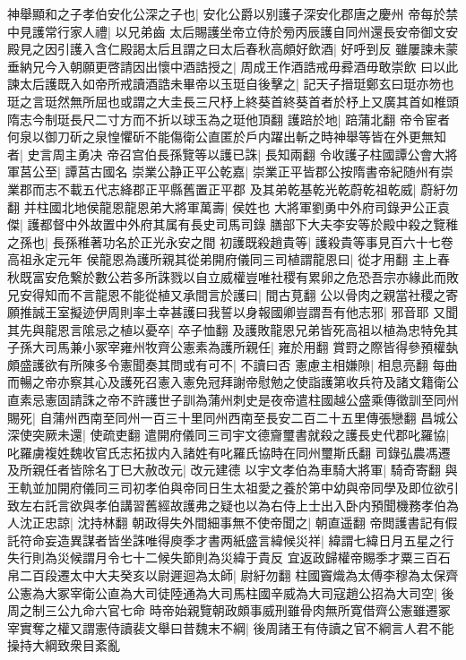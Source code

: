 神舉顯和之子孝伯安化公深之子也|{
	安化公爵以别護子深安化郡唐之慶州}
帝每於禁中見護常行家人禮|{
	以兄弟齒}
太后賜護坐帝立侍於㫄丙辰護自同州還長安帝御文安殿見之因引護入含仁殿謁太后且謂之曰太后春秋高頗好飲酒|{
	好呼到反}
雖屢諫未蒙垂納兄今入朝願更啓請因出懷中酒誥授之|{
	周成王作酒誥戒毋彛酒毋敢崇飲}
曰以此諫太后護既入如帝所戒讀酒誥未畢帝以玉珽自後擊之|{
	記天子搢珽鄭玄曰珽亦笏也珽之言珽然無所屈也或謂之大圭長三尺杼上終葵首終葵首者於杼上又廣其首如椎頭隋志今制珽長尺二寸方而不折以球玉為之珽他頂翻}
護踣於地|{
	踣蒲北翻}
帝令宦者何泉以御刀斫之泉惶懼斫不能傷衛公直匿於戶内躍出斬之時神舉等皆在外更無知者|{
	史言周主勇决}
帝召宫伯長孫覽等以護已誅|{
	長知兩翻}
令收護子柱國譚公會大將軍莒公至|{
	譚莒古國名}
崇業公静正平公乾嘉|{
	崇業正平皆郡公按隋書帝紀随州有崇業郡而志不載五代志絳郡正平縣舊置正平郡}
及其弟乾基乾光乾蔚乾祖乾威|{
	蔚紆勿翻}
并柱國北地侯龍恩龍恩弟大將軍萬壽|{
	侯姓也}
大將軍劉勇中外府司錄尹公正袁傑|{
	護都督中外故置中外府其属有長史司馬司錄}
膳部下大夫李安等於殿中殺之覽稚之孫也|{
	長孫稚著功名於正光永安之間}
初護既殺趙貴等|{
	護殺貴等事見百六十七卷高祖永定元年}
侯龍恩為護所親其從弟開府儀同三司植謂龍恩曰|{
	從才用翻}
主上春秋既富安危繋於數公若多所誅戮以自立威權豈唯社稷有累卵之危恐吾宗亦緣此而敗兄安得知而不言龍恩不能從植又承間言於護曰|{
	間古莧翻}
公以骨肉之親當社稷之寄願推誠王室擬迹伊周則率土幸甚護曰我誓以身報國卿豈謂吾有他志邪|{
	邪音耶}
又聞其先與龍恩言隂忌之植以憂卒|{
	卒子恤翻}
及護敗龍恩兄弟皆死高祖以植為忠特免其子孫大司馬兼小冢宰雍州牧齊公憲素為護所親任|{
	雍於用翻}
賞罸之際皆得參預權埶頗盛護欲有所陳多令憲聞奏其問或有可不|{
	不讀曰否}
憲慮主相嫌隙|{
	相息亮翻}
每曲而暢之帝亦察其心及護死召憲入憲免冠拜謝帝慰勉之使詣護第收兵符及諸文籍衛公直素忌憲固請誅之帝不許護世子訓為蒲州刺史是夜帝遣柱國越公盛乘傳徵訓至同州賜死|{
	自蒲州西南至同州一百三十里同州西南至長安二百二十五里傳張戀翻}
昌城公深使突厥未還|{
	使疏吏翻}
遣開府儀同三司宇文德齎璽書就殺之護長史代郡叱羅協|{
	叱羅虜複姓魏收官氏志拓拔内入諸姓有叱羅氏協時在同州璽斯氏翻}
司錄弘農馮遷及所親任者皆除名丁巳大赦改元|{
	改元建德}
以宇文孝伯為車騎大將軍|{
	騎奇寄翻}
與王軌並加開府儀同三司初孝伯與帝同日生太祖愛之養於第中幼與帝同學及即位欲引致左右託言欲與孝伯講習舊經故護弗之疑也以為右侍上士出入卧内預聞機務孝伯為人沈正忠諒|{
	沈持林翻}
朝政得失外間細事無不使帝聞之|{
	朝直遥翻}
帝閲護書記有假託符命妄造異謀者皆坐誅唯得庾季才書两紙盛言緯候災祥|{
	緯謂七緯日月五星之行失行則為災候謂月令七十二候失節則為災緯于貴反}
宜返政歸權帝賜季才粟三百石帛二百段遷太中大夫癸亥以尉遲迴為太師|{
	尉紆勿翻}
柱國竇熾為太傅李穆為太保齊公憲為大冢宰衛公直為大司徒陸通為大司馬柱國辛威為大司寇趙公招為大司空|{
	後周之制三公九命六官七命}
時帝始親覽朝政頗事威刑雖骨肉無所寛借齊公憲雖遷冢宰實奪之權又謂憲侍讀裴文舉曰昔魏末不綱|{
	後周諸王有侍讀之官不綱言人君不能操持大綱致衆目紊亂}
